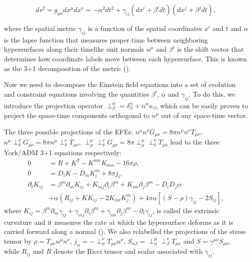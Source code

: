 \begin{equation}
\label{eq:4}
ds^{2} = g_{\mu\nu}dx^{\mu}dx^{\nu} = -\alpha^2dt^2 + \gamma_{ij}(dx^i+\beta^idt)(dx^j+\beta^jdt),
\end{equation}

where the spatial metric $\gamma_{ij}$ is a function of the spatial coordinates $x^{i}$ and $t$ and $\alpha$ is the lapse function that measures proper time between neighboring hypersurfaces along their timelike unit normals $n^{\mu}$ and $\beta^i$ is the shift vector that determines how coordinate labels move between each hypersurface. This is known as the 3+1 decomposition of the metric (\cite{arnowitt2008republication}).

Now we need to decompose the Einstein field equations into a set of evolution and constraint equations involving the quantities $\beta^i$, $\alpha$ and $\gamma_{ij}$. To do this, we introduce the projection operator $\perp^{\alpha}_{\beta} = \delta^{\alpha}_{\beta} + n^{\alpha} n_{\beta}$, which can be easily proven to project the space-time components orthogonal to $n^{\mu}$ out of any space-time vector.

The three possible projections of the EFEs: $n^{\mu} n^{\nu} G_{\mu\nu} = 8\pi n^{\mu} n^{\nu} T_{\mu\nu}$, $n^{\mu}\perp^{\nu}_{\delta}G_{\mu\nu} = 8\pi n^{\mu} \perp^{\nu}_{\delta} T_{\mu\nu}$, $\perp^{\mu}_{\rho} \perp^{\nu}_{\delta} G_{\mu\nu} = 8\pi \perp^{\mu}_{\rho} \perp^{\nu}_{\delta} T_{\mu\nu}$ lead to the three York/ADM 3+1 equations respectively:
%
\begin{align}
0 &= R + K^{2} - K^{mn}K_{mn} -16\pi\rho, \\
0 &= D_iK - D_mK^m_i + 8\pi j_i, \\
\partial_t K_{ij} &= \beta^m\partial_mK_{ij} + K_{mj}\partial_i\beta^m + K_{im}\partial_j\beta^m - D_iD_j\alpha \\ 
&+ \alpha(R_{ij}+KK_{ij}-2K_{im}K^m_{j})+4\pi\alpha[(S-\rho)\gamma_{ij}-2S_{ij}],
\end{align} 
%
where $K_{ij} = \beta^m\partial_m\gamma_{ij} + \gamma_{mj}\partial_{i}\beta^{m} + \gamma_{im}\partial_j\beta^{m}-\partial_{t}\gamma_{ij}$, is called the extrinsic curvature and it measures
the rate at which the hypersurface deforms as it is carried forward along a normal (\cite{baumgarte2010numerical}). We also relabelled the projections of the stress tensor by $\rho = T_{\mu\nu} n^{\mu} n^{\nu}$, $j_{\alpha}= -\perp^{\nu}_{\alpha} T_{\mu\nu} n^{\nu}$, $S_{\alpha\beta} = \perp^{\mu}_{\alpha} \perp^{\nu}_{\beta} T_{\mu\nu}$ and $S=\gamma^{\mu\nu} S_{\mu\nu}$, while $R_{ij}$ and $R$ denote the Ricci tensor and scalar associated with $\gamma_{ij}$.

